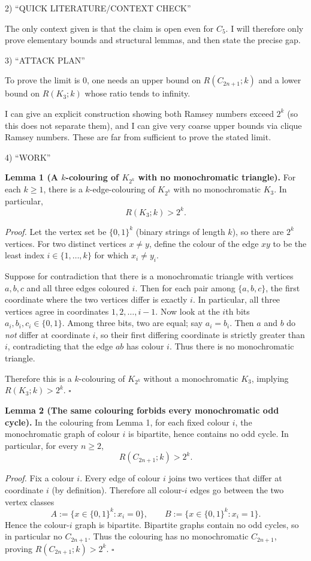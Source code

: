 2) “QUICK LITERATURE/CONTEXT CHECK”

The only context given is that the claim is open even for $C_5$. I will therefore only prove elementary bounds and structural lemmas, and then state the precise gap.

3) “ATTACK PLAN”

To prove the limit is $0$, one needs an upper bound on $R(C_{2n+1};k)$ and a lower bound on $R(K_3;k)$ whose ratio tends to infinity.

I can give an explicit construction showing both Ramsey numbers exceed $2^k$ (so this does not separate them), and I can give very coarse upper bounds via clique Ramsey numbers. These are far from sufficient to prove the stated limit.

4) “WORK”

\textbf{Lemma 1 (A $k$-colouring of $K_{2^k}$ with no monochromatic triangle).}
For each $k\ge 1$, there is a $k$-edge-colouring of $K_{2^k}$ with no monochromatic $K_3$. In particular,
\[
R(K_3;k) > 2^k.
\]

\emph{Proof.}
Let the vertex set be $\{0,1\}^k$ (binary strings of length $k$), so there are $2^k$ vertices.
For two distinct vertices $x\neq y$, define the colour of the edge $xy$ to be the least index $i\in\{1,\dots,k\}$ for which $x_i\neq y_i$.

Suppose for contradiction that there is a monochromatic triangle with vertices $a,b,c$ and all three edges coloured $i$. Then for each pair among $\{a,b,c\}$, the first coordinate where the two vertices differ is exactly $i$. In particular, all three vertices agree in coordinates $1,2,\dots,i-1$.
Now look at the $i$th bits $a_i,b_i,c_i\in\{0,1\}$. Among three bits, two are equal; say $a_i=b_i$. Then $a$ and $b$ do \emph{not} differ at coordinate $i$, so their first differing coordinate is strictly greater than $i$, contradicting that the edge $ab$ has colour $i$.
Thus there is no monochromatic triangle.

Therefore this is a $k$-colouring of $K_{2^k}$ without a monochromatic $K_3$, implying $R(K_3;k)>2^k$. $\square$

\textbf{Lemma 2 (The same colouring forbids every monochromatic odd cycle).}
In the colouring from Lemma 1, for each fixed colour $i$, the monochromatic graph of colour $i$ is bipartite, hence contains no odd cycle. In particular, for every $n\ge 2$,
\[
R(C_{2n+1};k) > 2^k.
\]

\emph{Proof.}
Fix a colour $i$. Every edge of colour $i$ joins two vertices that differ at coordinate $i$ (by definition). Therefore all colour-$i$ edges go between the two vertex classes
\[
A:=\{x\in\{0,1\}^k : x_i=0\},\qquad B:=\{x\in\{0,1\}^k : x_i=1\}.
\]
Hence the colour-$i$ graph is bipartite. Bipartite graphs contain no odd cycles, so in particular no $C_{2n+1}$.
Thus the colouring has no monochromatic $C_{2n+1}$, proving $R(C_{2n+1};k)>2^k$. $\square$

